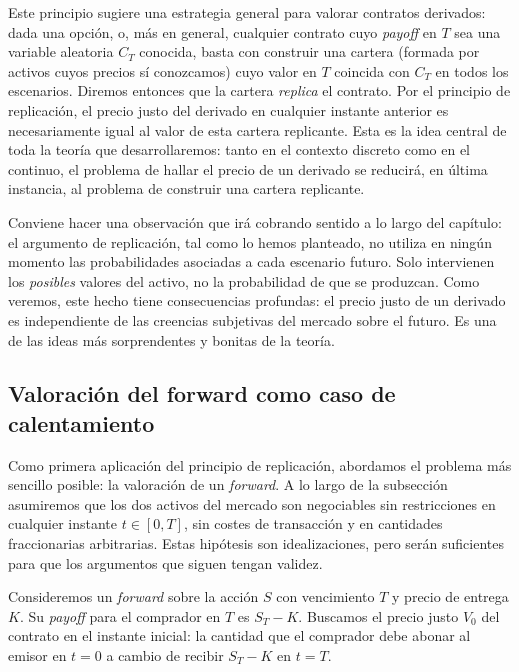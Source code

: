 \documentclass[11pt,a4paper,oneside]{report}
\theoremstyle{plain}
\theoremstyle{definition}
\theoremstyle{remark}
\newcommand{\1}{\mathbf{1}}
\begin{document}
Este principio sugiere una estrategia general para valorar contratos
derivados: dada una opción, o, más en general, cualquier contrato cuyo
\emph{payoff} en $T$ sea una variable aleatoria $C_T$ conocida, basta
con construir una cartera (formada por activos cuyos precios sí
conozcamos) cuyo valor en $T$ coincida con $C_T$ en todos los
escenarios. Diremos entonces que la cartera \emph{replica} el contrato.
Por el principio de replicación, el precio justo del derivado en
cualquier instante anterior es necesariamente igual al valor de esta
cartera replicante. Esta es la idea central de toda la teoría que
desarrollaremos: tanto en el contexto discreto como en el continuo, el
problema de hallar el precio de un derivado se reducirá, en última
instancia, al problema de construir una cartera replicante.

Conviene hacer
una observación que irá cobrando sentido a lo largo del capítulo: el
argumento de replicación, tal como lo hemos planteado, no utiliza en
ningún momento las probabilidades asociadas a cada escenario futuro.
Solo intervienen los \emph{posibles} valores del activo, no la
probabilidad de que se produzcan. Como veremos, este hecho tiene
consecuencias profundas: el precio justo de un derivado es independiente
de las creencias subjetivas del mercado sobre el futuro. Es una de las
ideas más sorprendentes y bonitas de la teoría.

\subsection{Valoración del forward como caso de calentamiento}
\label{subsec:forward}

Como primera aplicación del principio de replicación, abordamos el
problema más sencillo posible: la valoración de un \emph{forward}. A lo
largo de la subsección asumiremos que los dos activos del mercado son
negociables sin restricciones en cualquier instante $t \in [0, T]$, sin
costes de transacción y en cantidades fraccionarias arbitrarias. Estas
hipótesis son idealizaciones, pero serán suficientes para que los
argumentos que siguen tengan validez.

Consideremos un \emph{forward} sobre la acción $S$ con
vencimiento $T$ y precio de entrega $K$. Su \emph{payoff} para el
comprador en $T$ es $S_T - K$. Buscamos el precio justo $V_0$ del
contrato en el instante inicial: la cantidad que el comprador debe
abonar al emisor en $t = 0$ a cambio de recibir $S_T - K$ en $t = T$.
\end{document}
